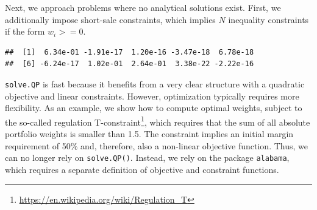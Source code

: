 \documentclass[
]{book}
\newenvironment{Shaded}{\begin{snugshade}}{\end{snugshade}}
\newcommand{\AttributeTok}[1]{\textcolor[rgb]{0.61,0.61,0.61}{#1}}
\newcommand{\DecValTok}[1]{\textcolor[rgb]{0.06,0.06,0.06}{#1}}
\newcommand{\FunctionTok}[1]{\textcolor[rgb]{0,0,0}{#1}}
\newcommand{\NormalTok}[1]{#1}
\newcommand{\OtherTok}[1]{\textcolor[rgb]{0.37,0.37,0.37}{#1}}
\newcommand{\SpecialCharTok}[1]{\textcolor[rgb]{0,0,0}{#1}}
\renewcommand{\href}[2]{#2\footnote{\url{#1}}}
\begin{document}
Next, we approach problems where no analytical solutions exist. First, we additionally impose short-sale constraints, which implies \(N\) inequality constraints if the form \(w_i >=0\).

\begin{Shaded}
\end{Shaded}

\begin{verbatim}
##  [1]  6.34e-01 -1.91e-17  1.20e-16 -3.47e-18  6.78e-18
##  [6] -6.24e-17  1.02e-01  2.64e-01  3.38e-22 -2.22e-16
\end{verbatim}

\texttt{solve.QP} is fast because it benefits from a very clear structure with a quadratic objective and linear constraints. However, optimization typically requires more flexibility. As an example, we show how to compute optimal weights, subject to the so-called \href{https://en.wikipedia.org/wiki/Regulation_T}{regulation T-constraint}, which requires that the sum of all absolute portfolio weights is smaller than 1.5. The constraint implies an initial margin requirement of 50\% and, therefore, also a non-linear objective function. Thus, we can no longer rely on \texttt{solve.QP()}. Instead, we rely on the package \texttt{alabama}, which requires a separate definition of objective and constraint functions.
\end{document}
